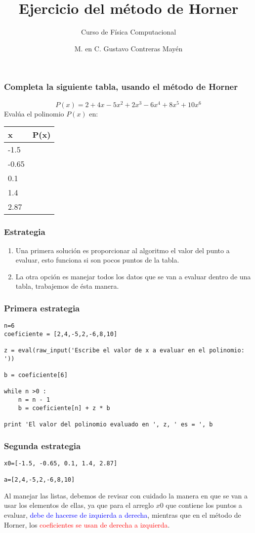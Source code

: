 \documentclass[12pt]{beamer}
\title{Ejercicio del m\'{e}todo de Horner}
\subtitle{Curso de F\'{i}sica Computacional}
\author{M. en C. Gustavo Contreras May\'{e}n}
\date{}
\begin{document}
\maketitle
\fontsize{14}{14}\selectfont
{}
\begin{frame}
\frametitle{Completa la siguiente tabla, usando el m\'{e}todo de Horner}
\[ P(x)=2 + 4 x - 5 x^{2} + 2 x^{3} - 6 x^{4} + 8 x^{5} + 10 x^{6}\]
Eval\'{u}a el polinomio $P(x)$ en:
\\
\medskip
\begin{center}
\begin{tabular}{l @{} | c}
x & P(x) \\
\hline -1.5 & \\
\hline -0.65 & \\
\hline 0.1 & \\
\hline 1.4 & \\
\hline 2.87 & 
\end{tabular}
\end{center}
\end{frame}
\begin{frame}
\frametitle{Estrategia}
\begin{enumerate}[<+->]
\item Una primera soluci\'{o}n es proporcionar al algoritmo el valor del punto a evaluar, esto funciona si son pocos puntos de la tabla.
\item La otra opci\'{o}n es manejar todos los datos que se van a evaluar dentro de una tabla, trabajemos de \'{e}sta manera.
\end{enumerate}
\end{frame}
\begin{frame}[fragile]
\frametitle{Primera estrategia}
\begin{lstlisting}
n=6
coeficiente = [2,4,-5,2,-6,8,10]

z = eval(raw_input('Escribe el valor de x a evaluar en el polinomio: '))

b = coeficiente[6]

while n >0 :
    n = n - 1    
    b = coeficiente[n] + z * b
  
print 'El valor del polinomio evaluado en ', z, ' es = ', b
\end{lstlisting}
\end{frame}
\begin{frame}[fragile]
\frametitle{Segunda estrategia}
\begin{lstlisting}
x0=[-1.5, -0.65, 0.1, 1.4, 2.87]

a=[2,4,-5,2,-6,8,10]   
\end{lstlisting}
Al manejar las listas, debemos de revisar con cuidado la manera en que se van a usar los elementos de ellas, ya que para el arreglo $x0$ que contiene los puntos a evaluar, \textcolor{blue}{debe de hacerse de izquierda a derecha}, mientras que en el m\'{e}todo de Horner, los \textcolor{red}{coeficientes se usan de derecha a izquierda}.
\end{frame}
\end{document}
